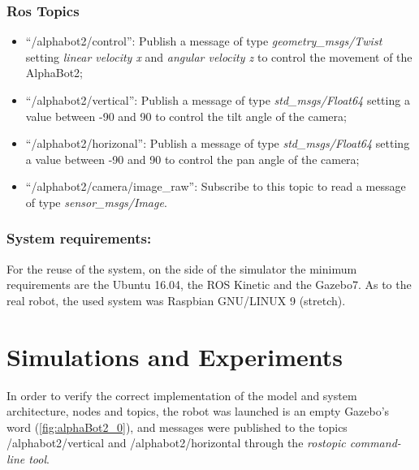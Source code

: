 \documentclass[conference]{IEEEtran}
\begin{document}
\subsubsection{Ros Topics}

\begin{itemize}
    \item ``/alphabot2/control'': Publish a message of type \textit{geometry\_msgs/Twist} setting \textit{linear velocity x} and \textit{angular velocity z} to control the movement of the AlphaBot2; 
    \item ``/alphabot2/vertical'': Publish a message of type \textit{std\_msgs/Float64} setting a value between -90 and 90 to control the tilt angle of the camera;
    \item ``/alphabot2/horizonal'': Publish a message of type \textit{std\_msgs/Float64} setting a value between -90 and 90 to control the pan angle of the camera;
    \item ``/alphabot2/camera/image\_raw'': Subscribe to this topic to read a message of type \textit{sensor\_msgs/Image}.
\end{itemize}

\subsubsection{System requirements:} \label{subsec:system_requirements}
For the reuse of the system, on the side of the simulator the minimum requirements are the Ubuntu 16.04, the ROS Kinetic and the Gazebo7. As to the real robot, the used system was Raspbian GNU/LINUX 9 (stretch).

\section{Simulations and Experiments}\label{sec:SimExp}
In order to verify the correct implementation of the model and system architecture, nodes and topics, the robot was launched is an empty Gazebo's word (\cref{fig:alphaBot2_0}), and messages were published to the topics /alphabot2/vertical and /alphabot2/horizontal through the \textit{rostopic command-line tool}.
\end{document}
